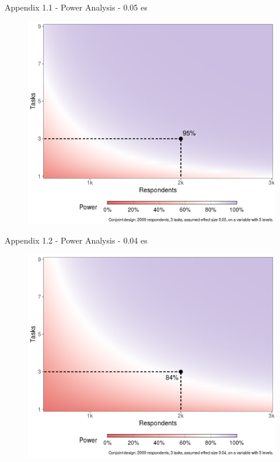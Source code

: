 \documentclass[9pt, aspectratio=169]{beamer}
\begin{document}
\begin{frame}
    \centering
    \vspace*{2em}
    \printbibliography
\end{frame}

\begin{frame}{Appendix 1.1 - Power Analysis - 0.05 es}
    \begin{figure}
        \centering
        \includegraphics[width=0.6\linewidth]{images/pa_3task.png}
        \label{fig:appendix1}
    \end{figure}
\end{frame}

\begin{frame}{Appendix 1.2 - Power Analysis - 0.04 es}
    \begin{figure}
        \centering
        \includegraphics[width=0.6\linewidth]{images/pa_3task_0.4effect.png}
        \label{fig:appendix2}
    \end{figure}    
\end{frame}
\end{document}
